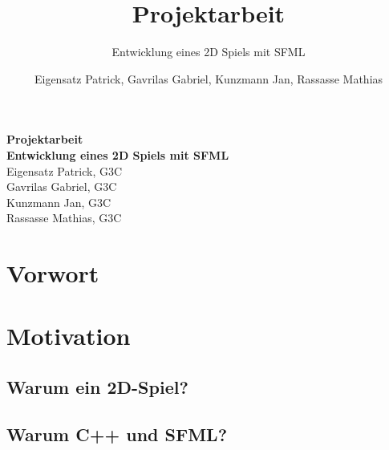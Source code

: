 \documentclass[12pt,a4paper]{scrartcl}
\title{Projektarbeit}
\subtitle{Entwicklung eines 2D Spiels mit SFML}
\author{
  Eigensatz Patrick,
  Gavrilas Gabriel,
  Kunzmann Jan,
  Rassasse Mathias   
}
\begin{document}
\begin{titlepage}
\begin{center}
\vspace*{3cm}
\textbf{\huge{Projektarbeit}}\\
\vspace*{2cm}
\textbf{\large{Entwicklung eines 2D Spiels mit SFML}}\\
\vspace*{5cm}
Eigensatz Patrick, G3C\\
Gavrilas Gabriel, G3C\\
Kunzmann Jan, G3C\\
Rassasse Mathias, G3C

\end{center}

\end{titlepage}


\newpage

\setcounter{page}{1}
\section*{Vorwort}
\blindtext[1]

\newpage


\tableofcontents

\newpage


\section{Motivation}
\subsection{Warum ein 2D-Spiel?}
\subsection{Warum C++ und SFML?}
\end{document}
